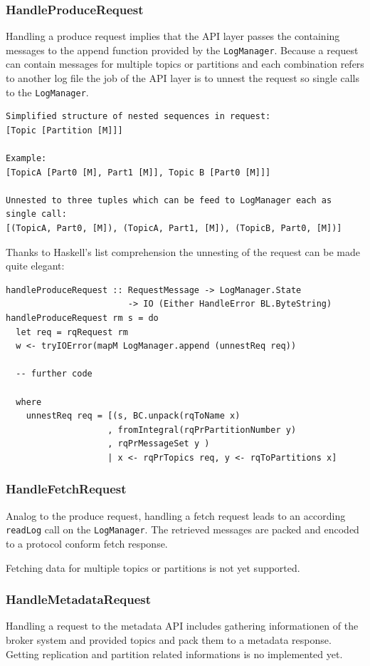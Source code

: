 \newpage
\subsubsection{HandleProduceRequest}
\label{subsec:broker-api-producerequest}
Handling a produce request implies that the API layer passes the containing
messages to the append function provided by the \lstinline{LogManager}. Because
a request can contain messages for multiple topics or partitions and each combination
refers to another log file the job of the API layer is to unnest the request so
single calls to the \lstinline{LogManager}.
\begin{verbatim}
Simplified structure of nested sequences in request:
[Topic [Partition [M]]]

Example:
[TopicA [Part0 [M], Part1 [M]], Topic B [Part0 [M]]]

Unnested to three tuples which can be feed to LogManager each as single call:
[(TopicA, Part0, [M]), (TopicA, Part1, [M]), (TopicB, Part0, [M])]

\end{verbatim}

Thanks to Haskell's list comprehension the unnesting of the request can be made quite elegant: 
\begin{lstlisting}
handleProduceRequest :: RequestMessage -> LogManager.State 
                        -> IO (Either HandleError BL.ByteString)
handleProduceRequest rm s = do
  let req = rqRequest rm
  w <- tryIOError(mapM LogManager.append (unnestReq req))

  -- further code 

  where
    unnestReq req = [(s, BC.unpack(rqToName x)
                    , fromIntegral(rqPrPartitionNumber y)
                    , rqPrMessageSet y ) 
                    | x <- rqPrTopics req, y <- rqToPartitions x]
\end{lstlisting}

\subsubsection{HandleFetchRequest}
\label{subsec:broker-api-fetchrequest}
Analog to the produce request, handling a fetch request leads to an according
\lstinline{readLog} call on the \lstinline{LogManager}. The retrieved messages
are packed and encoded to a protocol conform fetch response.

Fetching data for multiple topics or partitions is not yet supported.

\subsubsection{HandleMetadataRequest}
Handling a request to the metadata API includes gathering informationen of the
broker system and provided topics and pack them to a metadata response. Getting
replication and partition related informations is no implemented yet.

